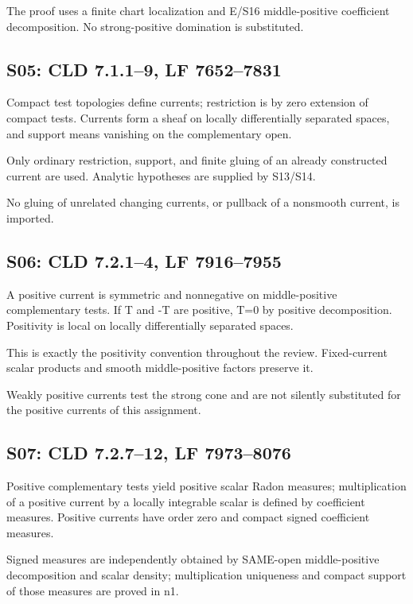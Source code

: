 \documentclass[11pt]{article}
\begin{document}
The proof uses a finite chart localization and E/S16 middle-positive coefficient decomposition. No strong-positive domination is substituted.

\subsection*{S05: CLD 7.1.1--9, LF 7652--7831}

Compact test topologies define currents; restriction is by zero extension of compact tests. Currents form a sheaf on locally differentially separated spaces, and support means vanishing on the complementary open.

Only ordinary restriction, support, and finite gluing of an already constructed current are used. Analytic hypotheses are supplied by S13/S14.

No gluing of unrelated changing currents, or pullback of a nonsmooth current, is imported.

\subsection*{S06: CLD 7.2.1--4, LF 7916--7955}

A positive current is symmetric and nonnegative on middle-positive complementary tests. If T and -T are positive, T=0 by positive decomposition. Positivity is local on locally differentially separated spaces.

This is exactly the positivity convention throughout the review. Fixed-current scalar products and smooth middle-positive factors preserve it.

Weakly positive currents test the strong cone and are not silently substituted for the positive currents of this assignment.

\subsection*{S07: CLD 7.2.7--12, LF 7973--8076}

Positive complementary tests yield positive scalar Radon measures; multiplication of a positive current by a locally integrable scalar is defined by coefficient measures. Positive currents have order zero and compact signed coefficient measures.

Signed measures are independently obtained by SAME-open middle-positive decomposition and scalar density; multiplication uniqueness and compact support of those measures are proved in n1.
\end{document}
